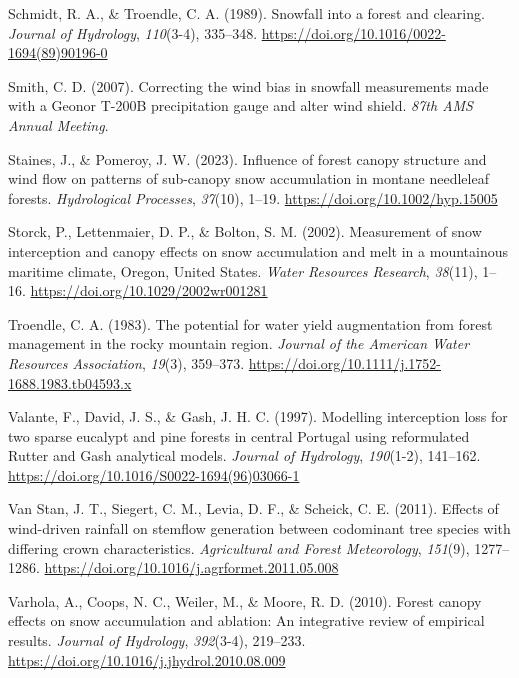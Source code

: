\documentclass[
  letterpaper,
  DIV=11,
  numbers=noendperiod]{scrartcl}
\newlength{\cslhangindent}
\newenvironment{CSLReferences}[2] %
 {\begin{list}{}{%
  \setlength{\itemindent}{0pt}
  \setlength{\leftmargin}{0pt}
  \setlength{\parsep}{0pt}
  \ifodd #1
   \setlength{\leftmargin}{\cslhangindent}
   \setlength{\itemindent}{-1\cslhangindent}
  \fi
  \setlength{\itemsep}{#2\baselineskip}}}
 {\end{list}}
\begin{document}
\begin{CSLReferences}{1}{0}
Schmidt, R. A., \& Troendle, C. A. (1989). Snowfall into a forest and
clearing. \emph{Journal of Hydrology}, \emph{110}(3-4), 335--348.
\url{https://doi.org/10.1016/0022-1694(89)90196-0}

Smith, C. D. (2007). Correcting the wind bias in snowfall measurements
made with a {Geonor T-200B} precipitation gauge and alter wind shield.
\emph{87th {AMS} Annual Meeting}.

Staines, J., \& Pomeroy, J. W. (2023). Influence of forest canopy
structure and wind flow on patterns of sub-canopy snow accumulation in
montane needleleaf forests. \emph{Hydrological Processes},
\emph{37}(10), 1--19. \url{https://doi.org/10.1002/hyp.15005}

Storck, P., Lettenmaier, D. P., \& Bolton, S. M. (2002). Measurement of
snow interception and canopy effects on snow accumulation and melt in a
mountainous maritime climate, {Oregon}, {United States}. \emph{Water
Resources Research}, \emph{38}(11), 1--16.
\url{https://doi.org/10.1029/2002wr001281}

Troendle, C. A. (1983). The potential for water yield augmentation from
forest management in the rocky mountain region. \emph{Journal of the
American Water Resources Association}, \emph{19}(3), 359--373.
\url{https://doi.org/10.1111/j.1752-1688.1983.tb04593.x}

Valante, F., David, J. S., \& Gash, J. H. C. (1997). Modelling
interception loss for two sparse eucalypt and pine forests in central
{Portugal} using reformulated {Rutter} and {Gash} analytical models.
\emph{Journal of Hydrology}, \emph{190}(1-2), 141--162.
\url{https://doi.org/10.1016/S0022-1694(96)03066-1}

Van Stan, J. T., Siegert, C. M., Levia, D. F., \& Scheick, C. E. (2011).
Effects of wind-driven rainfall on stemflow generation between
codominant tree species with differing crown characteristics.
\emph{Agricultural and Forest Meteorology}, \emph{151}(9), 1277--1286.
\url{https://doi.org/10.1016/j.agrformet.2011.05.008}

Varhola, A., Coops, N. C., Weiler, M., \& Moore, R. D. (2010). Forest
canopy effects on snow accumulation and ablation: {An} integrative
review of empirical results. \emph{Journal of Hydrology},
\emph{392}(3-4), 219--233.
\url{https://doi.org/10.1016/j.jhydrol.2010.08.009}


\end{CSLReferences}
\end{document}
